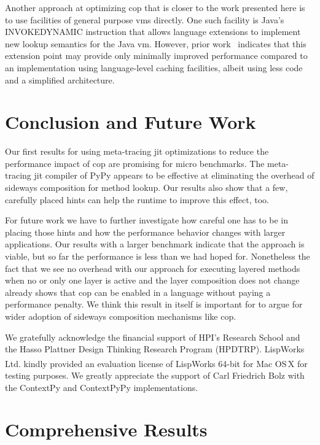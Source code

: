 \documentclass[preprint,english,10pt,nonatbib]{sigplanconf}
\begin{document}
Another approach at optimizing \ac{cop} that is closer to the work presented
here is to use facilities of general purpose \acp{vm} directly. One such
facility is Java's INVOKEDYNAMIC instruction that allows language extensions to
implement new lookup semantics for the Java \ac{vm}. However, prior
work~\cite{appeltauer2010layered} indicates that this extension point may
provide only minimally improved performance compared to an implementation using
language-level caching facilities, albeit using less code and a simplified
architecture.

\section{Conclusion and Future Work}

Our first results for using meta-tracing \ac{jit} optimizations to reduce the
performance impact of \ac{cop} are promising for micro benchmarks. The
meta-tracing \ac{jit} compiler of PyPy appears to be effective at eliminating
the overhead of sideways composition for method lookup. Our results also show
that a few, carefully placed hints can help the runtime to improve this effect,
too.

For future work we have to further investigate how careful one has to be in
placing those hints and how the performance behavior changes with larger
applications. Our results with a larger benchmark indicate that the approach is
viable, but so far the performance is less than we had hoped for. Nonetheless
the fact that we see no overhead with our approach for executing layered methods
when no or only one layer is active and the layer composition does not change
already shows that \ac{cop} can be enabled in a language without paying a
performance penalty. We think this result in itself is important for to argue
for wider adoption of sideways composition mechanisms like \ac{cop}.

\acks
We gratefully acknowledge the financial support of HPI's Research School and
the Hasso Plattner Design Thinking Research Program (HPDTRP).
LispWorks Ltd. kindly provided an evaluation license of
LispWorks\textsuperscript{\textregistered} 64-bit for Mac OS\,X for testing
purposes. We greatly appreciate the support of Carl Friedrich Bolz with the
ContextPy and ContextPyPy implementations.
\printbibliography
\appendix
{}
\section{Comprehensive Results}


\end{document}
